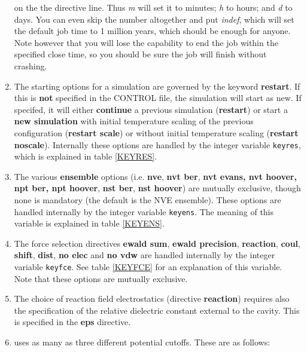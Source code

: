 \begin{enumerate}
      on the the directive line. Thus {\em m} will set it to minutes; {\em h}
      to hours; and {\em d} to days. You can even skip the number altogether
      and put {\em indef}, which will set the default job time to 1 million
      years, which should be enough for anyone. Note however that you will
      lose the capability to end the job within the specified close time, so
      you should be sure the job will finish without crashing.
\item The starting options for a simulation are governed by the
      keyword {\bf restart}. If this is {\bf not} specified in the
      CONTROL file, the simulation will start as new. If specifed, it
      will either {\bf continue} a previous simulation ({\bf restart}) or
      start a {\bf new simulation} with initial temperature scaling of the
      previous configuration ({\bf restart scale}) or without initial
      temperature scaling ({\bf restart noscale}). Internally these
      options are handled by the integer variable {\tt keyres}, which
      is explained in table \ref{KEYRES}.
\item The various {\bf ensemble} options (i.e. {\bf nve}, 
      {\bf nvt ber}, {\bf nvt evans, {\bf nvt hoover}, {\bf npt ber},
      {\bf npt hoover}}, {\bf nst ber}, {\bf nst hoover}) are mutually 
      exclusive, though none is mandatory (the default is the NVE 
      ensemble). These options are handled 
      internally by the integer variable {\tt keyens}. The meaning of
      this variable is explained in table \ref{KEYENS}. 
\item The force selection directives {\bf ewald sum}, {\bf ewald
      precision}, {\bf reaction}, 
      {\bf coul}, {\bf shift}, {\bf dist}, {\bf no elec} and 
      {\bf no vdw} are handled internally by the integer variable 
      {\tt keyfce}. See table \ref{KEYFCE} for an explanation of this
      variable. Note that these options are mutually exclusive.
\item The choice of reaction field electrostatics (directive {\bf reaction})
       requires also the specification of the relative dielectric constant
       external to the cavity. This is specified in the {\bf eps} directive.
\item \D{} uses as many as three different potential cutoffs. These
      are as follows:

\end{enumerate}
